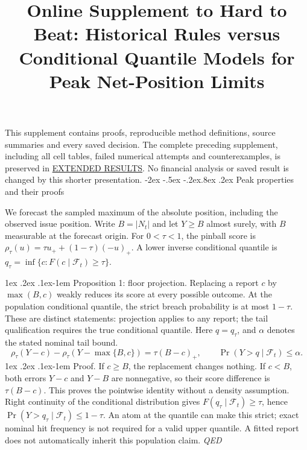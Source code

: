 \documentclass[12pt,a4paper]{article}
\title{Online Supplement to Hard to Beat: Historical Rules versus Conditional Quantile Models for Peak Net-Position Limits}
\author{}
\date{}
\makeatletter
\renewcommand\section{\@startsection{section}{1}{\z@}%
  {-2ex \@plus -.5ex \@minus -.2ex}{.8ex \@plus .2ex}%
  {\normalfont\large\bfseries}}
\renewcommand\paragraph{\@startsection{paragraph}{4}{\z@}%
  {1ex \@plus .2ex \@minus .1ex}{-1em}%
  {\normalfont\normalsize\bfseries}}
\makeatother
\begin{document}
\maketitle


This supplement contains proofs, reproducible method definitions, source summaries and every saved decision. The complete preceding supplement, including all cell tables, failed numerical attempts and counterexamples, is preserved in \href{https://github.com/ByronLi0207/financial-mathematics-paper-20261020/blob/submission-final/EXTENDED_RESULTS.md}{EXTENDED RESULTS}. No financial analysis or saved result is changed by this shorter presentation.
\setcounter{tocdepth}{1}
\tableofcontents
\medskip
\section{Peak properties and their proofs}\label{sup:floor}\label{sup:levy}

We forecast the sampled maximum of the absolute position, including
the observed issue position. Write \(B=|N_t|\) and let \(Y\ge B\) almost surely,
with \(B\) measurable at the forecast origin. For \(0<\tau<1\), the pinball score is
\(\rho_\tau(u)=\tau u_+ +(1-\tau)(-u)_+\). A lower inverse conditional quantile
is \(q_\tau=\inf\{c:F(c\mid\mathcal F_t)\ge\tau\}\).

\paragraph{Proposition 1: floor projection.}
Replacing a report \(c\) by \(\max(B,c)\) weakly reduces its score at every possible
outcome. At the population conditional quantile, the strict breach probability
is at most \(1-\tau\). These are distinct statements: projection applies to any
report; the tail qualification requires the true conditional quantile.
Here \(q=q_\tau\), and \(\alpha\) denotes the stated nominal tail bound.
\[
\rho_\tau(Y-c)-\rho_\tau(Y-\max\{B,c\})=\tau(B-c)_+,\qquad \Pr(Y>q\mid\mathcal F_t)\le\alpha.
\]
\paragraph{Proof.}
If \(c\ge B\), the replacement changes nothing. If \(c<B\), both errors
\(Y-c\) and \(Y-B\) are nonnegative, so their score difference is
\(\tau(B-c)\). This proves the pointwise identity without a density assumption.
Right continuity of the conditional distribution gives
\(F(q_\tau\mid\mathcal F_t)\ge\tau\), hence
\(\Pr(Y>q_\tau\mid\mathcal F_t)\le1-\tau\). An atom at the quantile can make
this strict; exact nominal hit frequency is not required for a valid upper
quantile. A fitted report does not automatically inherit this population claim.
\hfill\textit{QED}
\end{document}

